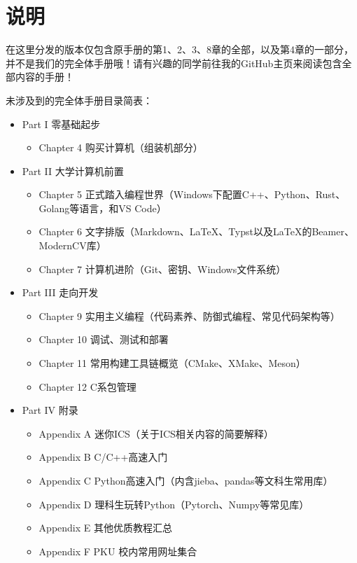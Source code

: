 \documentclass[../main.tex]{subfiles}
\begin{document}
\chapter{说明}

  在这里分发的版本仅包含原手册的第1、2、3、8章的全部，以及第4章的一部分，并不是我们的完全体手册哦！请有兴趣的同学前往我的GitHub主页来阅读包含全部内容的手册！
  
  未涉及到的完全体手册目录简表：
  \begin{itemize}
  \item Part I 零基础起步
  \begin{itemize}
    \item Chapter 4 购买计算机（组装机部分）
  \end{itemize}

  \item Part II 大学计算机前置
  \begin{itemize}
    \item Chapter 5 正式踏入编程世界（Windows下配置C++、Python、Rust、Golang等语言，和VS Code）
    \item Chapter 6 文字排版（Markdown、LaTeX、Typst以及LaTeX的Beamer、ModernCV库）
    \item Chapter 7 计算机进阶（Git、密钥、Windows文件系统）
  \end{itemize}

  \item Part III 走向开发
  \begin{itemize}
    \item Chapter 9 实用主义编程（代码素养、防御式编程、常见代码架构等）
    \item Chapter 10 调试、测试和部署
    \item Chapter 11 常用构建工具链概览（CMake、XMake、Meson）
    \item Chapter 12 C系包管理
  \end{itemize}

  \item Part IV 附录
  \begin{itemize}
    \item Appendix A 迷你ICS（关于ICS相关内容的简要解释）
    \item Appendix B C/C++高速入门
    \item Appendix C Python高速入门（内含jieba、pandas等文科生常用库）
    \item Appendix D 理科生玩转Python（Pytorch、Numpy等常见库）
    \item Appendix E 其他优质教程汇总
    \item Appendix F PKU 校内常用网址集合
  \end{itemize}
\end{itemize}
\end{document}
